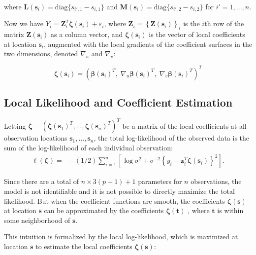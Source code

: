 \documentclass[authoryear,review, 12pt]{elsarticle}
\begin{document}
where $\bm{L}\left(\bm{s}_{i}\right)=\text{diag}\{s_{i',1}-s_{i,1}\}$
and $\bm{M}\left(\bm{s}_{i}\right)=\text{diag}\{s_{i',2}-s_{i,2}\}$
for $i'=1,\dots,n$.

Now we have $Y_{i}=\bm{Z}_{i}^{T}\bm{\zeta}(\bm{s}_{i})+\varepsilon_{i}$,
where $\bm{Z}_{i}=\left\{ \bm{Z}(\bm{s}_{i})\right\} _{i}$ is the
$i$th row of the matrix $\bm{Z}(\bm{s}_{i})$ as a column vector,
and $\bm{\zeta}(\bm{s}_{i})$ is the vector of local coefficients
at location $\bm{s}_{i}$, augmented with the local gradients of the
coefficient surfaces in the two dimensions, denoted $\nabla_{u}$
and $\nabla_{v}$:

\begin{equation}
\bm{\zeta}(\bm{s}_{i})=\left(\bm{\beta}(\bm{s}_{i})^{T},\;\nabla_{u}\bm{\beta}(\bm{s}_{i})^{T},\;\nabla_{v}\bm{\beta}(\bm{s}_{i})^{T}\right)^{T}\label{eq:augmented-coefficients}
\end{equation}



\subsection{Local Likelihood and Coefficient Estimation}

Letting $\bm{\zeta}=\left(\bm{\zeta}\left(\bm{s}_{1}\right)^{T},\dots,\bm{\zeta}\left(\bm{s}_{n}\right)^{T}\right)^{T}$
be a matrix of the local coefficients at all observation locations
$\bm{s}_{1},\dots,\bm{s}_{n}$, the total log-likelihood of the observed
data is the sum of the log-likelihood of each individual observation:
\begin{align}
\ell\left(\bm{\zeta}\right)= & -(1/2)\sum_{i=1}^{n}\left[\log{\sigma^{2}}+\sigma^{-2}\left\{ y_{i}-\bm{z}_{i}^{T}\bm{\zeta}(\bm{s}_{i})\right\} ^{2}\right].\label{eq:coefficients}
\end{align}


Since there are a total of $n\times3(p+1)+1$ parameters for $n$
observations, the model is not identifiable and it is not possible
to directly maximize the total likelihood. But when the coefficient
functions are smooth, the coefficients $\bm{\zeta}\left(\bm{s}\right)$
at location $\bm{s}$ can be approximated by the coefficients $\bm{\zeta}\left(\bm{t}\right)$
, where $\bm{t}$ is within some neighborhood of $\bm{s}$.

This intuition is formalized by the local log-likelihood, which is
maximized at location $\bm{s}$ to estimate the local coefficients
$\bm{\zeta}(\bm{s})$:
\end{document}
